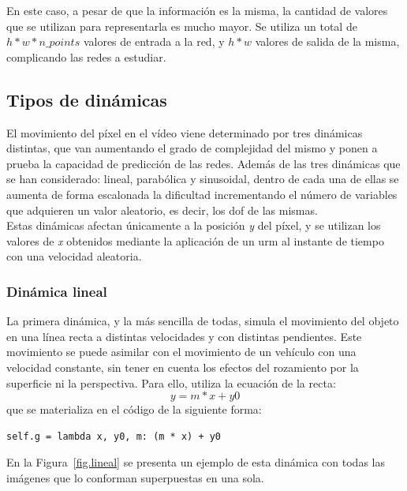 En este caso, a pesar de que la información es la misma, la cantidad de valores que se utilizan para representarla es mucho mayor. Se utiliza un total de \textit{$h * w * n\_points$}  valores de entrada a la red, y \textit{$h * w$} valores de salida de la misma, complicando las redes a estudiar.

\subsection{Tipos de dinámicas} \label{ap.dinamicas}

El movimiento del píxel en el vídeo viene determinado por tres dinámicas distintas, que van aumentando el grado de complejidad del mismo y ponen a prueba la capacidad de predicción de las redes. Además de las tres dinámicas que se han considerado: lineal, parabólica y  sinusoidal, dentro de cada una de ellas se aumenta de forma escalonada la dificultad incrementando el número de variables que adquieren un valor aleatorio, es decir, los \acrfull{dof} de las mismas.\\

Estas dinámicas afectan únicamente a la posición \textit{y} del píxel, y se utilizan los valores de \textit{x} obtenidos mediante la aplicación de un \acrfull{urm} al instante de tiempo con una velocidad aleatoria.

\subsubsection{Dinámica lineal}

La primera dinámica, y la más sencilla de todas, simula el movimiento del objeto en una línea recta a distintas velocidades y con distintas pendientes. Este movimiento se puede asimilar con el movimiento de un vehículo con una velocidad constante, sin tener en cuenta los efectos del rozamiento por la superficie ni la perspectiva. Para ello, utiliza la ecuación de la recta:
$$y = m*x + y0$$
que se materializa en el código de la siguiente forma:
\vspace{10pt}
\begin{lstlisting}[frame=single]
  self.g = lambda x, y0, m: (m * x) + y0
\end{lstlisting}

En la Figura~\ref{fig.lineal} se presenta un ejemplo de esta dinámica con todas las imágenes que lo conforman superpuestas en una sola.

